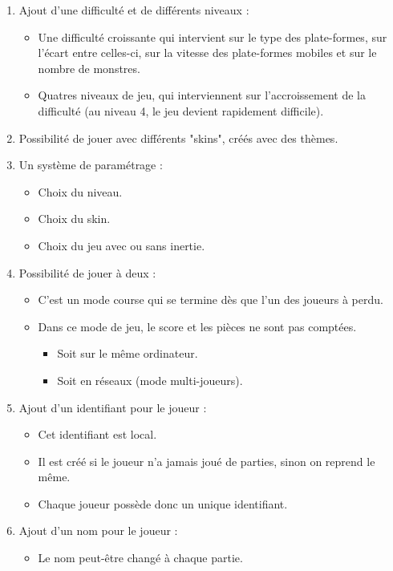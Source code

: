 \documentclass{article}
\begin{document}
\begin{enumerate}
    \item Ajout d'une difficulté et de différents niveaux :
    \begin{itemize}
        \item Une difficulté croissante qui intervient sur le type des plate-formes, sur l'écart entre celles-ci, sur la vitesse des plate-formes mobiles et sur le nombre de monstres.
        \item Quatres niveaux de jeu, qui interviennent sur l'accroissement de la difficulté (au niveau 4, le jeu devient rapidement difficile).
    \end{itemize}
    \item Possibilité de jouer avec différents "skins", créés avec des thèmes.
    \item Un système de paramétrage :
    \begin{itemize}
        \item Choix du niveau.
        \item Choix du skin.
        \item Choix du jeu avec ou sans inertie.
    \end{itemize}
    \item Possibilité de jouer à deux :
    \begin{itemize}
        \item C'est un mode course qui se termine dès que l'un des joueurs à perdu.
        \item Dans ce mode de jeu, le score et les pièces ne sont pas comptées.
        \begin{itemize}
            \item Soit sur le même ordinateur.
            \item Soit en réseaux (mode multi-joueurs).
        \end{itemize}
    \end{itemize}
    \item Ajout d'un identifiant pour le joueur :
    \begin{itemize}
        \item Cet identifiant est local.
        \item Il est créé si le joueur n'a jamais joué de parties, sinon on reprend le même.
        \item Chaque joueur possède donc un unique identifiant.
    \end{itemize}
    \item Ajout d'un nom pour le joueur :
    \begin{itemize}
        \item Le nom peut-être changé à chaque partie.

\end{itemize}
\end{enumerate}
\end{document}
